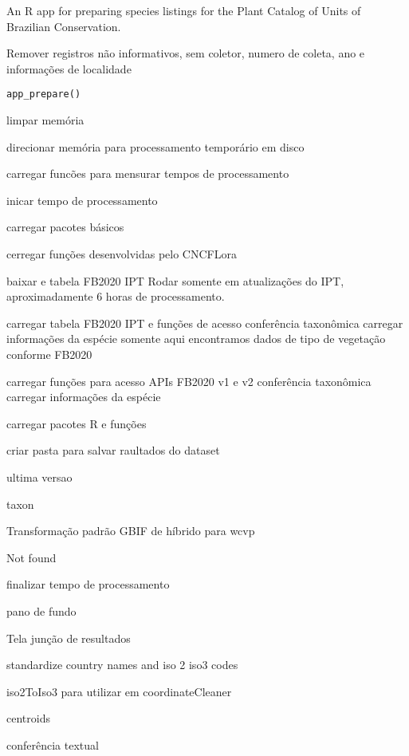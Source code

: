 \documentclass[a4paper]{book}
\begin{document}
%
\begin{Description}
An R app for preparing species listings for the Plant Catalog of Units of Brazilian Conservation.

Remover registros não informativos, sem coletor, numero de coleta, ano e informações de localidade
\end{Description}
%
\begin{Usage}
\begin{verbatim}
app_prepare()
\end{verbatim}
\end{Usage}
%
\begin{Details}
limpar memória

direcionar memória para processamento temporário em disco

carregar funcões para mensurar tempos de processamento

inicar tempo de processamento

carregar pacotes básicos

cerregar funções desenvolvidas pelo CNCFLora

baixar e tabela FB2020 IPT
Rodar somente em atualizações do IPT, aproximadamente 6 horas de processamento.

carregar tabela FB2020 IPT e funções de acesso
conferência taxonômica
carregar informações da espécie
somente aqui encontramos dados de tipo de vegetação conforme FB2020

carregar funções para acesso APIs FB2020 v1 e v2
conferência taxonômica
carregar informações da espécie

carregar pacotes R e funções

criar pasta para salvar raultados do dataset

ultima versao

taxon

Transformação padrão GBIF de híbrido para wcvp

Not found

finalizar tempo de processamento

pano de fundo

Tela junção de resultados

standardize country names and iso 2 iso3 codes

iso2ToIso3 para utilizar em coordinateCleaner

centroids

conferência textual
\end{Details}
\end{document}
